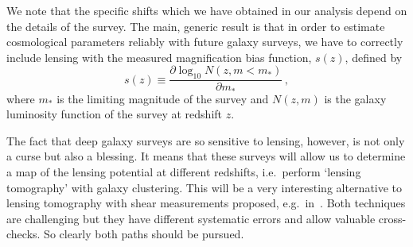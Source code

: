 We note that
the specific shifts which we have obtained in our analysis depend  on the details of the survey. The main, generic result is that in order to estimate cosmological parameters reliably with future galaxy surveys, we have to correctly include lensing with the measured magnification bias function, $s(z)$, defined by
$$ s(z)  \equiv \frac{\partial\log_{10} N(z,m<m_*)}{\partial m_*}\,,  $$
where $m_*$ is the limiting magnitude of the survey and $N(z,m)$ is the galaxy luminosity function of the survey at redshift $z$.

The fact that deep galaxy surveys are so sensitive to lensing, however, is not only a curse but also a blessing. It means that these surveys will allow us to determine a map of the lensing potential at different redshifts, i.e.\ perform `lensing tomography' with galaxy clustering. This will be a very interesting alternative to lensing tomography with shear measurements proposed, e.g.\
in~\cite{Heavens:2003jx}. Both techniques are challenging but they have different systematic errors and allow valuable cross-checks. So clearly both paths should be pursued.
